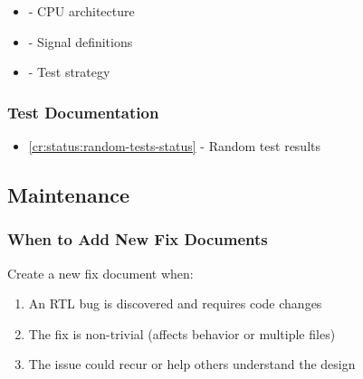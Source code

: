 \begin{record}

\begin{itemize}
\tightlist
\item
   - CPU architecture
\item
   - Signal definitions
\item
   - Test strategy
\end{itemize}

\end{record}

\subsubsection{Test Documentation}\label{cr:fix:fixes-readme:test-documentation}

\begin{record}

\begin{itemize}
\tightlist
\item
  \cref{cr:status:random-tests-status} - Random test results
\end{itemize}

\end{record}

\subsection{Maintenance}\label{cr:fix:fixes-readme:maintenance}

\subsubsection{When to Add New Fix Documents}\label{cr:fix:fixes-readme:when-to-add-new-fix-documents}

\begin{record}

Create a new fix document when:

\begin{enumerate}
\def\labelenumi{\arabic{enumi}.}
\tightlist
\item
  An RTL bug is discovered and requires code changes
\item
  The fix is non-trivial (affects behavior or multiple files)
\item
  The issue could recur or help others understand the design
\end{enumerate}

\end{record}


